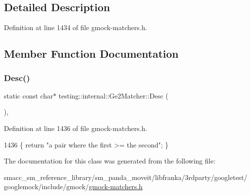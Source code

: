 \subsection{Detailed Description}


Definition at line 1434 of file gmock-\/matchers.\+h.



\subsection{Member Function Documentation}
\mbox{\label{classtesting_1_1internal_1_1Ge2Matcher_a29fa53bdfa6778b709eaef017aeea855}} 
\subsubsection{\texorpdfstring{Desc()}{Desc()}}
{\footnotesize\ttfamily static const char$\ast$ testing\+::internal\+::\+Ge2\+Matcher\+::\+Desc (\begin{DoxyParamCaption}{ }\end{DoxyParamCaption})\hspace{0.3cm}{\ttfamily [inline]}, {\ttfamily [static]}}



Definition at line 1436 of file gmock-\/matchers.\+h.


\begin{DoxyCode}
1436 \{ \textcolor{keywordflow}{return} \textcolor{stringliteral}{"a pair where the first >= the second"}; \}
\end{DoxyCode}


The documentation for this class was generated from the following file\+:\begin{DoxyCompactItemize}
\item 
smacc\+\_\+sm\+\_\+reference\+\_\+library/sm\+\_\+panda\+\_\+moveit/libfranka/3rdparty/googletest/googlemock/include/gmock/\hyperlink{gmock-matchers_8h}{gmock-\/matchers.\+h}\end{DoxyCompactItemize}
